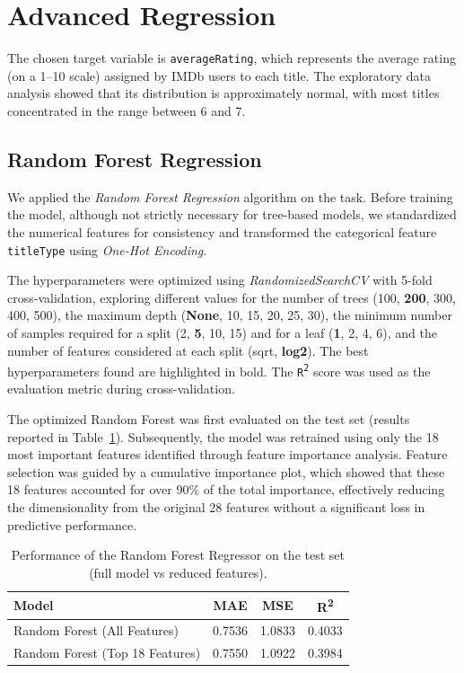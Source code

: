 \section{Advanced Regression}

The chosen target variable is \texttt{averageRating}, which represents 
the average rating (on a 1--10 scale) assigned by IMDb users to each title. The exploratory 
data analysis showed that its distribution is approximately normal, 
with most titles concentrated in the range between 6 and 7. 

\subsection{Random Forest Regression}
We applied the \textit{Random Forest Regression} algorithm on the task.
Before training the model, although not strictly necessary for tree-based models, 
we standardized the numerical features for consistency and transformed the categorical feature
\texttt{titleType} using \textit{One-Hot Encoding}.

The hyperparameters were optimized using \textit{RandomizedSearchCV} with 5-fold cross-validation, 
exploring different values for the number of trees (100, \textbf{200}, 300, 400, 500), 
the maximum depth (\textbf{None}, 10, 15, 20, 25, 30), 
the minimum number of samples required for a split (2, \textbf{5}, 10, 15) and for a leaf
(\textbf{1}, 2, 4, 6), and the number of features considered at each split (sqrt, \textbf{log2}). 
The best hyperparameters found are highlighted in bold. 
The \texttt{R\textsuperscript{2}} score was used as the evaluation metric during cross-validation.

 
The optimized Random Forest was first evaluated on the test set (results reported in Table~\ref{tab:rf_metrics}).
Subsequently, the model was retrained using only the 18 most important features identified through feature importance analysis.
Feature selection was guided by a cumulative importance plot, which showed that these 18 features accounted for over 90\% 
of the total importance, effectively reducing the dimensionality from the original 28 features without a significant loss in predictive performance.

\begin{table}[h]
\centering
\caption{Performance of the Random Forest Regressor on the test set 
(full model vs reduced features).}
\label{tab:rf_metrics}
\begin{tabular}{lccc}
\hline
\textbf{Model} & \textbf{MAE} & \textbf{MSE} & \textbf{R\textsuperscript{2}} \\
\hline
Random Forest (All Features) & 0.7536 & 1.0833 & 0.4033 \\
Random Forest (Top 18 Features) & 0.7550 & 1.0922 & 0.3984 \\
\hline
\end{tabular}
\end{table}

